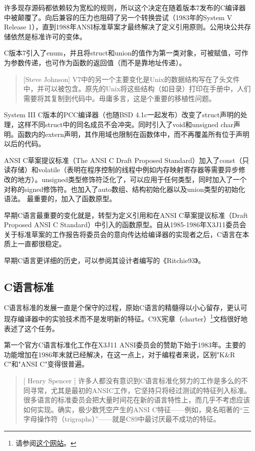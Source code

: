 \documentclass[12pt,oneside]{ctexbook}
\begin{document}
\begin{common-format}
许多现存源码都依赖较为宽松的规则，所以这个决定在随着版本7发布的C编译器中被颠覆了。向后兼容的压力也阻碍了另一个转换尝试（1983年的System V Release 1），直到1988年ANSI标准草案才最终解决了定义引用原则。公用块公共存储依然是标准许可的变体。

C版本7引入了enum，并且将struct和union的值作为第一类对象，可被赋值，可作为参数传递，也可作为函数的返回值（而不是靠地址传递）。

\begin{quote}[Steve Johnson]
V7中的另一个主要变化是Unix的数据结构写在了头文件中，并可以被包含。原先的Unix将这些结构（如目录）打印在手册中，人们需要将其复制到代码中。毋庸多言，这是个重要的移植性问题。
\end{quote}

System III C版本的PCC编译器（也随BSD 4.1c一起发布）改变了struct声明的处理，这样不同struct中的同名成员不会冲突。同时引入了void和unsigned char声明。函数内的extern声明，其作用域也限制在函数体中，而不再覆盖所有位于声明以后的代码。

ANSI C草案提议标准（The ANSI C Draft Proposed Standard）加入了const（只读存储）和volatile（表明在程序控制的线程中例如内存映射寄存器等需要异步修改的地方）。unsigned类型修饰符泛化了，可以应用于任何类型，同时加入了一个对称的signed修饰符。也加入了auto数组、结构初始化器以及union类型的初始化语法。
最重要的，加入了函数原型。

早期C语言最重要的变化就是，转型为定义引用和在ANSI C草案提议标准（Draft Proposed ANSI C Standard）中引入的函数原型。自从1985-1986年X3J11委员会关于标准草案的工作报告将委员会的意向传达给编译器的实现者之后，C语言在本质上一直都很稳定。

早期C语言更详细的历史，可以参阅其设计者编写的《Ritchie93》。

\subsection{C语言标准}
C语言标准的发展一直是个保守的过程，原始C语言的精髓得以小心留存，更认可现存编译器中的实验技术而不是发明新的特征。C9X宪章（charter）\footnote{请参阅\href{http://anubis.dkuug.dk/JTC1/SC22/WG14/www/charter}{这个网站}。}文档很好地表述了这个任务。

第一个官方C语言标准化工作在X3J11 ANSI委员会的赞助下始于1983年。主要的功能增加在1986年末就已经解决，在这一点上，对于编程者来说，区别"K\&{}R C"和"ANSI C"变得很普遍。

\begin{quote}[ Henry Spencer 	]
许多人都没有意识到C语言标准化努力的工作是多么的不同寻常，尤其是最初的ANSIC工作，它坚持只将经过测试的特征列入标准。很多语言的标准委员会把大量时间花在新的语言特性上，而几乎不考虑应该如何实现。确实，极少数凭空产生的ANSI C特征——例如，臭名昭著的“三字母操作符（trigraphs）”——就是C89中最讨厌最不成功的特征。
\end{quote}


\end{common-format}
\end{document}
